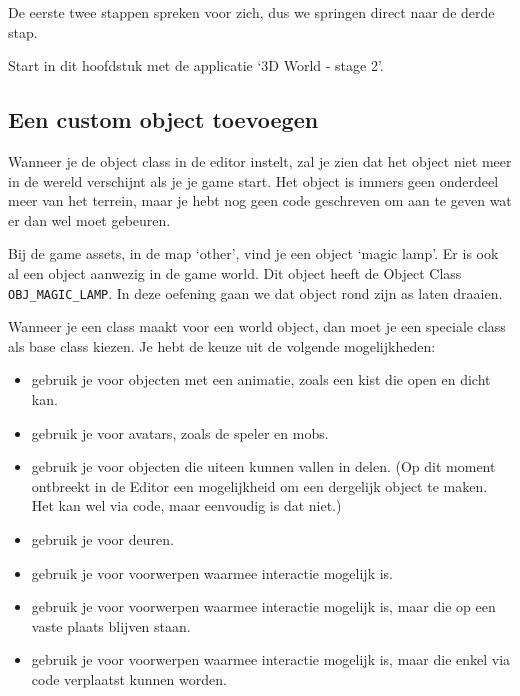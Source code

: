 De eerste twee stappen spreken voor zich, dus we springen direct naar de derde stap.

\begin{note}
Start in dit hoofdstuk met de applicatie `3D World - stage 2'.
\end{note}

\subsection{Een custom object toevoegen}
\label{subsection:addObject}
Wanneer je de object class in de editor instelt, zal je zien dat het object niet meer in de wereld verschijnt als je je game start. Het object is immers geen onderdeel meer van het terrein, maar je hebt nog geen code geschreven om aan te geven wat er dan wel moet gebeuren. 

\begin{note}
Bij de game assets, in de map `other', vind je een object `magic lamp'. Er is ook al een object aanwezig in de game world. Dit object heeft de Object Class \texttt{OBJ\_MAGIC\_LAMP}. In deze oefening gaan we dat object rond zijn as laten draaien.
\end{note}

Wanneer je een class maakt voor een world object, dan moet je een speciale class als base class kiezen. Je hebt de keuze uit de volgende mogelijkheden:

\begin{itemize}
	\item {} gebruik je voor objecten met een animatie, zoals een kist die open en dicht kan.
	\item {} gebruik je voor avatars, zoals de speler en mobs.
	\item {} gebruik je voor objecten die uiteen kunnen vallen in delen. (Op dit moment ontbreekt in de Editor een mogelijkheid om een dergelijk object te maken. Het kan wel via code, maar eenvoudig is dat niet.)
	\item {} gebruik je voor deuren.
	\item {} gebruik je voor voorwerpen waarmee interactie mogelijk is.
	\item {} gebruik je voor voorwerpen waarmee interactie mogelijk is, maar die op een vaste plaats blijven staan.
	\item {} gebruik je voor voorwerpen waarmee interactie mogelijk is, maar die enkel via code verplaatst kunnen worden.
\end{itemize}


